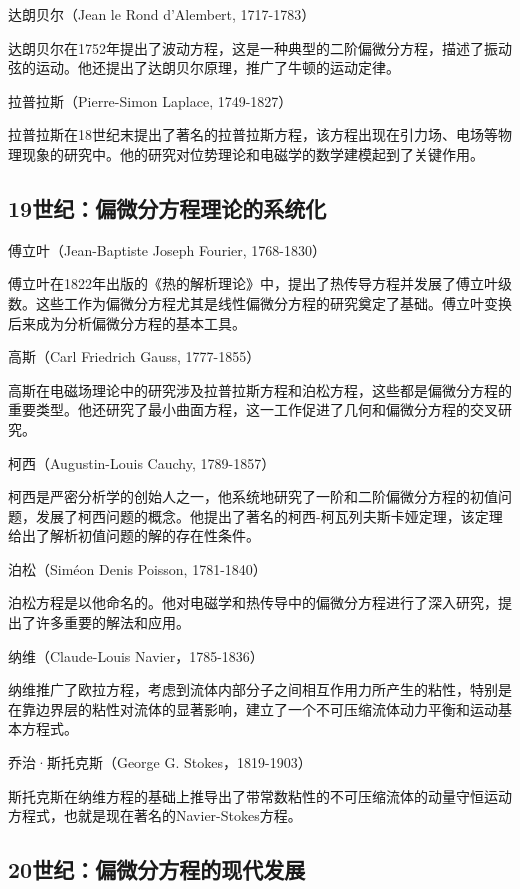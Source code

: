 \documentclass{article}
\begin{document}
达朗贝尔（Jean le Rond d'Alembert, 1717-1783）

达朗贝尔在1752年提出了波动方程，这是一种典型的二阶偏微分方程，描述了振动弦的运动。他还提出了达朗贝尔原理，推广了牛顿的运动定律。

拉普拉斯（Pierre-Simon Laplace, 1749-1827）

拉普拉斯在18世纪末提出了著名的拉普拉斯方程，该方程出现在引力场、电场等物理现象的研究中。他的研究对位势理论和电磁学的数学建模起到了关键作用。


\subsection{19世纪：偏微分方程理论的系统化}

傅立叶（Jean-Baptiste Joseph Fourier, 1768-1830）

傅立叶在1822年出版的《热的解析理论》中，提出了热传导方程并发展了傅立叶级数。这些工作为偏微分方程尤其是线性偏微分方程的研究奠定了基础。傅立叶变换后来成为分析偏微分方程的基本工具。

高斯（Carl Friedrich Gauss, 1777-1855）

高斯在电磁场理论中的研究涉及拉普拉斯方程和泊松方程，这些都是偏微分方程的重要类型。他还研究了最小曲面方程，这一工作促进了几何和偏微分方程的交叉研究。

柯西（Augustin-Louis Cauchy, 1789-1857）

柯西是严密分析学的创始人之一，他系统地研究了一阶和二阶偏微分方程的初值问题，发展了柯西问题的概念。他提出了著名的柯西-柯瓦列夫斯卡娅定理，该定理给出了解析初值问题的解的存在性条件。

泊松（Siméon Denis Poisson, 1781-1840）

泊松方程是以他命名的。他对电磁学和热传导中的偏微分方程进行了深入研究，提出了许多重要的解法和应用。

纳维（Claude-Louis Navier，1785-1836）

纳维推广了欧拉方程，考虑到流体内部分子之间相互作用力所产生的粘性，特别是在靠边界层的粘性对流体的显著影响，建立了一个不可压缩流体动力平衡和运动基本方程式。

乔治·斯托克斯（George G. Stokes，1819-1903）

斯托克斯在纳维方程的基础上推导出了带常数粘性的不可压缩流体的动量守恒运动方程式，也就是现在著名的Navier-Stokes方程。


\subsection{20世纪：偏微分方程的现代发展}
\end{document}
